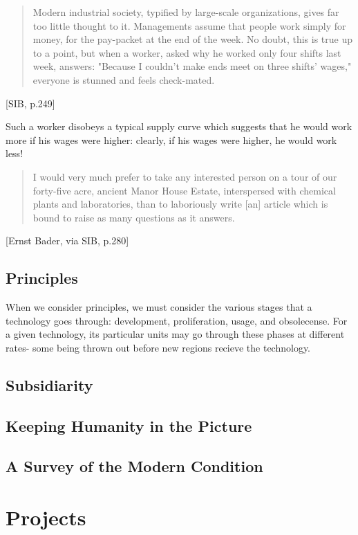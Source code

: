 \documentclass[letterpaper]{article}
\begin{document}
\begin{quote}
  Modern industrial society, typified by large-scale organizations, gives far too little thought to it. Managements assume that people work simply for money, for the pay-packet at the end of the week. No doubt, this is true up to a point, but when a worker, asked why he worked only four shifts last week, answers: "Because I couldn't make ends meet on three shifts' wages," everyone is stunned and feels check-mated.
\end{quote}[SIB, p.249]

Such a worker disobeys a typical supply curve which suggests that he would work more if his wages were higher: clearly, if his wages were higher, he would work less!


\begin{quote}
  I would very much prefer to take any interested person on a tour of our forty-five acre, ancient Manor House Estate, interspersed with chemical plants and laboratories, than to laboriously write [an] article which is bound to raise as many questions as it answers.
\end{quote}[Ernst Bader, via SIB, p.280]


\subsection{Principles}

When we consider principles, we must consider the various stages that a technology goes through: development, proliferation, usage, and obsolecense. For a given technology, its particular units may go through these phases at different rates- some being thrown out before new regions recieve the technology.

\subsection{Subsidiarity}

\subsection{Keeping Humanity in the Picture}

\subsection{A Survey of the Modern Condition}

\section{Projects}
\end{document}
